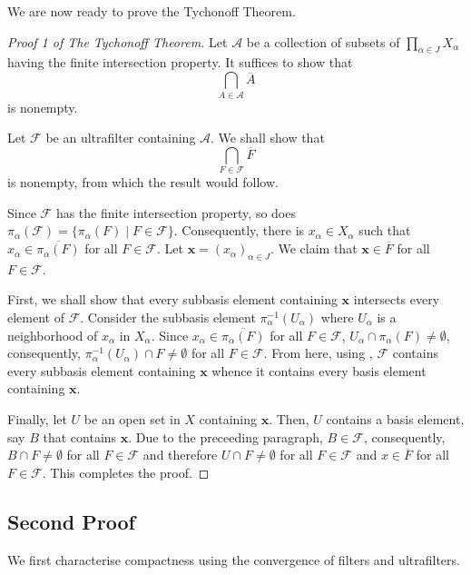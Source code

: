 We are now ready to prove the Tychonoff Theorem.

\begin{proof}[Proof 1 of The Tychonoff Theorem]
    Let $\mathscr A$ be a collection of subsets of $\prod\limits_{\alpha\in J} X_\alpha$ having the finite intersection property. It suffices to show that 
    \begin{equation*}
        \bigcap_{A\in\mathscr A} \overline A
    \end{equation*}
    is nonempty.

    Let $\mathcal F$ be an ultrafilter containing $\mathscr A$. We shall show that 
    \begin{equation*}
        \bigcap_{F\in\mathcal F}\overline{F}
    \end{equation*}
    is nonempty, from which the result would follow. 

    Since $\mathcal F$ has the finite intersection property, so does $\pi_\alpha(\mathcal F) = \{\pi_\alpha(F)\mid F\in\mathcal F\}$. Consequently, there is $x_\alpha\in X_\alpha$ such that $x_\alpha\in\overline{\pi_\alpha(F)}$ for all $F\in\mathcal F$. Let $\mathbf x = (x_\alpha)_{\alpha\in J}$. We claim that $\mathbf x\in\overline F$ for all $F\in\mathcal F$.

    First, we shall show that every subbasis element containing $\mathbf x$ intersects every element of $\mathcal F$. Consider the subbasis element $\pi_\alpha^{-1}(U_\alpha)$ where $U_\alpha$ is a neighborhood of $x_\alpha$ in $X_\alpha$. Since $x_\alpha\in\overline{\pi_\alpha(F)}$ for all $F\in\mathcal F$, $U_\alpha\cap\pi_\alpha(F)\ne\emptyset$, consequently, $\pi_\alpha^{-1}(U_\alpha)\cap F\ne\emptyset$ for all $F\in\mathcal F$. From here, using , $\mathcal F$ contains every subbasis element containing $\mathbf x$ whence it contains every basis element containing $\mathbf x$.

    Finally, let $U$ be an open set in $X$ containing $\mathbf x$. Then, $U$ contains a basis element, say $B$ that contains $\mathbf x$. Due to the preceeding paragraph, $B\in\mathcal F$, consequently, $B\cap F\ne\emptyset$ for all $F\in\mathcal F$ and therefore $U\cap F\ne\emptyset$ for all $F\in\mathcal F$ and $x\in\overline{F}$ for all $F\in\mathcal F$. This completes the proof.
\end{proof}

\subsection{Second Proof}
We first characterise compactness using the convergence of filters and ultrafilters.

